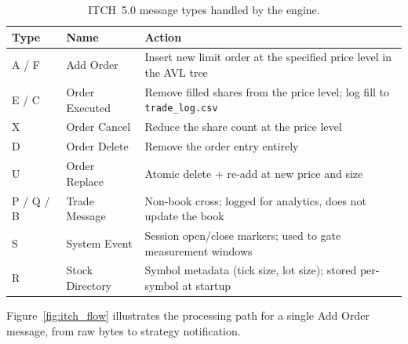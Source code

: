 \documentclass[12pt]{article}
\begin{document}
\begin{table}[H]
\centering
\small
\caption{ITCH~5.0 message types handled by the engine.}
\label{tab:itch_msgs}
\begin{tabularx}{\textwidth}{@{}p{1.2cm}p{3.2cm}X@{}}
\toprule
\textbf{Type} & \textbf{Name} & \textbf{Action} \\
\midrule
A / F & Add Order &
  Insert new limit order at the specified price level in the AVL tree \\[2pt]
E / C & Order Executed &
  Remove filled shares from the price level; log fill to \texttt{trade\_log.csv} \\[2pt]
X     & Order Cancel &
  Reduce the share count at the price level \\[2pt]
D     & Order Delete &
  Remove the order entry entirely \\[2pt]
U     & Order Replace &
  Atomic delete + re-add at new price and size \\[2pt]
P / Q / B & Trade Message &
  Non-book cross; logged for analytics, does not update the book \\[2pt]
S     & System Event &
  Session open/close markers; used to gate measurement windows \\[2pt]
R     & Stock Directory &
  Symbol metadata (tick size, lot size); stored per-symbol at startup \\
\bottomrule
\end{tabularx}
\end{table}

Figure~\ref{fig:itch_flow} illustrates the processing path for a
single Add Order message, from raw bytes to strategy notification.
\end{document}
